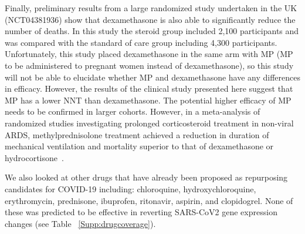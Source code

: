 \documentclass[Minh_PhD_thesis.tex]{subfiles}
\begin{document}
Finally, preliminary results from a large randomized study undertaken in the UK \\(NCT04381936) show that dexamethasone is also able to significantly reduce the number of deaths. In this study the steroid group included 2,100 participants and was compared with the standard of care group including 4,300 participants. Unfortunately, this study placed dexamethasone in the same arm with MP (MP to be administered to pregnant women instead of dexamethasone), so this study will not be able to elucidate whether MP and dexamethasone have any differences in efficacy. However, the results of the clinical study presented here suggest that MP has a lower NNT than dexamethasone. The potential higher efficacy of MP needs to be confirmed in larger cohorts. However, in a meta-analysis of randomized studies investigating prolonged corticosteroid treatment in non-viral ARDS, methylprednisolone treatment achieved a reduction in duration of mechanical ventilation and mortality superior to that of dexamethasone or hydrocortisone~\cite{meduri2020pharmacological}.

We also looked at other drugs that have already been proposed as repurposing candidates for COVID-19 including: chloroquine, hydroxychloroquine, erythromycin, prednisone, ibuprofen, ritonavir, aspirin, and clopidogrel. None of these was predicted to be effective in reverting SARS-CoV2 gene expression changes (see Table ~\ref{Supp:drugcoverage}).
\end{document}
